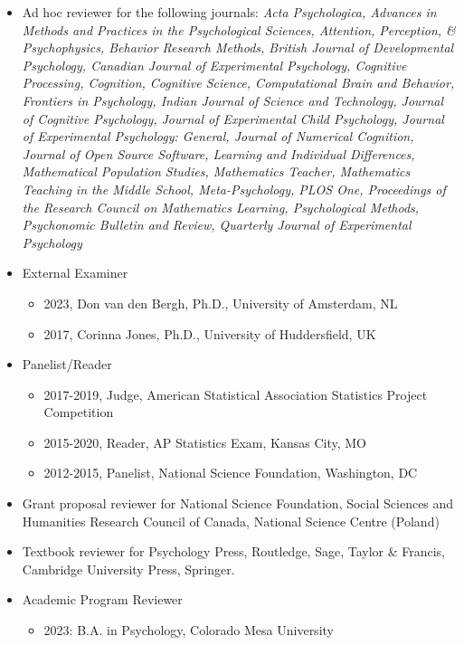 \documentclass[article,10pt]{article}
\begin{document}
\begin{itemize}
\item Ad hoc reviewer for the following journals: \emph{Acta Psychologica, Advances in Methods and Practices in the Psychological Sciences, Attention, Perception, \& Psychophysics, Behavior Research Methods, British Journal of Developmental Psychology, Canadian Journal of Experimental Psychology, Cognitive Processing, Cognition, Cognitive Science, Computational Brain and Behavior, Frontiers in Psychology, Indian Journal of Science and Technology, Journal of Cognitive Psychology, Journal of Experimental Child Psychology, Journal of Experimental Psychology: General, Journal of Numerical Cognition, Journal of Open Source Software, Learning and Individual Differences, Mathematical Population Studies, Mathematics Teacher, Mathematics Teaching in the Middle School, Meta-Psychology, PLOS One, Proceedings of the Research Council on Mathematics Learning, Psychological Methods, Psychonomic Bulletin and Review, Quarterly Journal of Experimental Psychology}
\item External Examiner
\begin{itemize}
\item 2023, Don van den Bergh, Ph.D., University of Amsterdam, NL
\item 2017, Corinna Jones, Ph.D., University of Huddersfield, UK
\end{itemize}
\item Panelist/Reader
\begin{itemize}
\item 2017-2019, Judge, American Statistical Association Statistics Project Competition
\item 2015-2020, Reader, AP Statistics Exam, Kansas City, MO
\item 2012-2015, Panelist, National Science Foundation, Washington, DC
\end{itemize}
\item Grant proposal reviewer for National Science Foundation, Social Sciences and Humanities Research Council of Canada, National Science Centre (Poland)
\item Textbook reviewer for Psychology Press, Routledge, Sage, Taylor \& Francis, Cambridge University Press, Springer.
\item Academic Program Reviewer
\begin{itemize}
\item 2023: B.A. in Psychology, Colorado Mesa University
\end{itemize}
\end{itemize}
\end{document}
